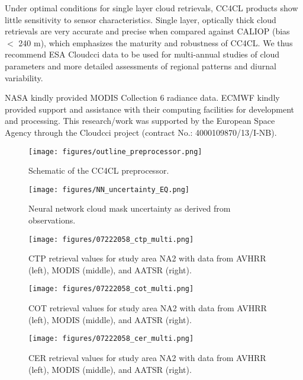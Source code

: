 Under optimal conditions for single layer cloud retrievals, CC4CL products show little sensitivity to sensor characteristics. Single layer, optically thick cloud retrievals are very accurate and precise when compared against CALIOP (bias $<$ 240 m), which emphasizes the maturity and robustness of CC4CL. We thus recommend ESA Cloud\textunderscore cci data to be used for multi-annual studies of cloud parameters and more detailed assessments of regional patterns and diurnal variability.

\appendix

\begin{acknowledgements}
NASA kindly provided MODIS Collection 6 radiance data. ECMWF kindly provided support and assistance with their computing facilities for development and processing.
This research/work was supported by the European Space Agency through the Cloud\textunderscore cci project (contract No.: 4000109870/13/I-NB).
\end{acknowledgements}




\clearpage

\begin{figure}[h]
  \texttt{[image: figures/outline\_preprocessor.png]}
  \caption{Schematic of the CC4CL preprocessor.}
  \label{fig:CC4CL_preprocessor}
\end{figure}

\clearpage

\begin{figure}[h]
  \texttt{[image: figures/NN\_uncertainty\_EQ.png]}
  \caption{Neural network cloud mask uncertainty as derived from observations.}
  \label{fig:NN_unc}
\end{figure}

\clearpage

\begin{figure*}[h]
  \texttt{[image: figures/07222058\_ctp\_multi.png]}
  \caption{CTP retrieval values for study area NA2 with data from AVHRR (left), MODIS (middle), and AATSR (right).}
  \label{fig:CTP_intercomparison}

  \texttt{[image: figures/07222058\_cot\_multi.png]}
  \caption{COT retrieval values for study area NA2 with data from AVHRR (left), MODIS (middle), and AATSR (right).}
  \label{fig:COT_intercomparison}

  \texttt{[image: figures/07222058\_cer\_multi.png]}
  \caption{CER retrieval values for study area NA2 with data from AVHRR (left), MODIS (middle), and AATSR (right).}
  \label{fig:CER_intercomparison}
\end{figure*}

